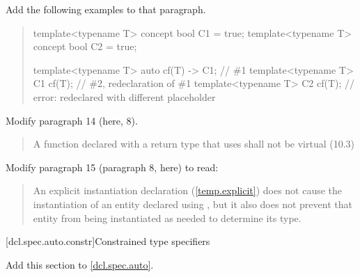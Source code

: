 Add the following examples to that paragraph.

\begin{quote}
\begin{addedblock}
\begin{codeblock}
template<typename T> concept bool C1 = true;
template<typename T> concept bool C2 = true;

template<typename T> auto cf(T) -> C1; // \#1
template<typename T> C1 cf(T);         // \#2, redeclaration of \#1
template<typename T> C2 cf(T);         // error: redeclared with different placeholder
\end{codeblock}
\end{addedblock}
\end{quote}

Modify paragraph 14 (here, 8).

\begin{quote}
\pnum
A function declared with a return type that uses 
shall not be virtual (10.3)
\end{quote}


Modify paragraph 15 (paragraph 8, here) to read:

\begin{quote}
\setcounter{Paras}{7}
\pnum
An explicit instantiation declaration (\ref{temp.explicit}) does not cause the 
instantiation of an entity declared using 
,
but it also does not prevent that entity from being instantiated as needed to
determine its type. 
\end{quote}

[dcl.spec.auto.constr]{Constrained type specifiers}

Add this section to \ref{dcl.spec.auto}.

